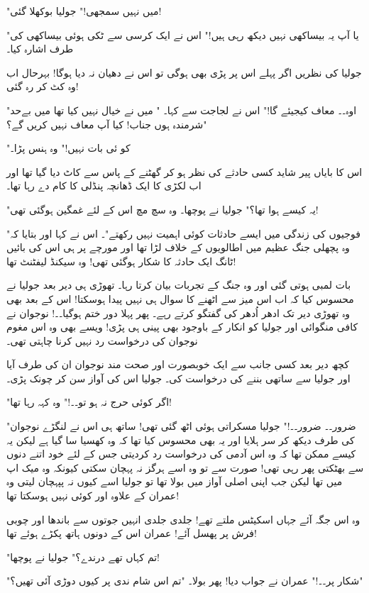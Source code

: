 "میں نہیں سمجھی!" جولیا بوکھلا گئی!

"ٌیا آپ یہ بیساکھی نہیں دیکھ رہی ہیں!" اس نے ایک کرسی سے ٹکی ہوئی بیساکھی کی طرف اشارہ کیا۔

جولیا کی نظریں اگر پہلے اس پر پڑی بھی ہوگی تو اس نے دھیان نہ دیا ہوگا! بہرحال اب وہ کٹ کر رہ گئی!

"اوہ۔۔ معاف کیجیئے گا!" اس نے لجاجت سے کہا۔ " میں نے خیال نہیں کیا تھا میں بےحد شرمندہ ہوں جناب! کیا آپ معاف نہیں کریں گے؟"

"کو ئی بات نہیں!" وہ ہنس پڑا۔

اس کا بایاں پیر شاید کسی حادثے کی نظر ہو کر گھٹنے کے پاس سے کاٹ دیا گیا تھا اور اب لکڑی کا ایک ڈھانچہ پنڈلی کا کام دے رہا تھا۔

"یہ کیسے ہوا تھا؟" جولیا نے پوچھا۔ وہ سچ مچ اس کے لئے غمگین ہوگئی تھی!

"فوجیوں کی زندگی میں ایسے حادثات کوئی اہمیت نہیں رکھتے"۔ اس نے کہا اور بتایا کہ وہ پچھلی جنگ عظیم میں اطالویوں کے خلاف لڑا تھا اور مورچے پر ہی اس کی بائیں ٹانگ ایک حادثہ کا شکار ہوگئی تھی! وہ سیکنڈ لیفٹنٹ تھا!

بات لمبی ہوتی گئی اور وہ جنگ کے تجربات بیان کرتا رہا۔ تھوڑی ہی دیر بعد جولیا نے محسوس کیا کہ اب اس میز سے اٹھنے کا سوال ہی نہیں پیدا ہوسکتا! اس کے بعد بھی وہ تھوڑی دیر تک ادھر اُدھر کی گفتگو کرتے رہے۔ پھر پہلا دور ختم ہوگیا۔۔! نوجوان نے کافی منگوائی اور جولیا کو انکار کے باوجود بھی پینی ہی پڑی! ویسے بھی وہ اس مغوم نوجوان کی درخواست رد نہیں کرنا چاہتی تھی۔

کچھ دیر بعد کسی جانب سے ایک خوبصورت اور صحت مند نوجوان ان کی طرف آیا اور جولیا سے ساتھی بننے کی درخواست کی۔ جولیا اس کی آواز سن کر چونک پڑی۔

"اگر کوئی حرج نہ ہو تو۔۔!" وہ کہہ رہا تھا!

"ضرور۔۔ ضرور۔۔!" جولیا مسکراتی ہوئی اٹھ گئی تھی! ساتھ ہی اس نے لنگڑے نوجوان کی طرف دیکھ کر سر ہلایا اور یہ بھی محسوس کیا تھا کہ وہ کھسیا سا گیا ہے لیکن یہ کیسے ممکن تھا کہ وہ اس آدمی کی درخواست رد کردیتی جس کے لئے خود اتنے دنوں سے بھٹکتی پھر رہی تھی! صورت سے تو وہ اسے ہرگز نہ پہچان سکتی کیونکہ وہ میک اپ میں تھا لیکن جب اپنی اصلی آواز میں بولا تھا تو جولیا اسے کیوں نہ پپہچان لیتی وہ عمران کے علاوہ اور کوئی نہیں ہوسکتا تھا!

وہ اس جگہ آئے جہاں اسکیٹس ملتے تھے! جلدی جلدی انہیں جوتوں سے باندھا اور چوبی فرش پر پھسل آئے! عمران اس کے دونوں ہاتھ پکڑے ہوئے تھا!

"تم کہاں تھے درندے؟" جولیا نے پوچھا!

"شکار پر۔۔!" عمران نے جواب دیا! پھر بولا۔ "تم اس شام ندی پر کیوں دوڑی آئی تھیں؟"

